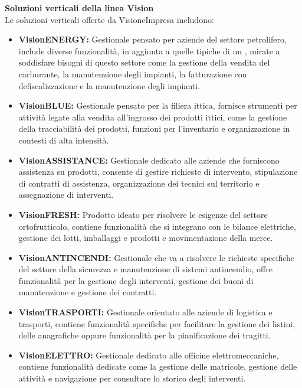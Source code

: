 \textbf{Soluzioni verticali della linea Vision}\\
Le soluzioni verticali offerte da VisioneImpresa includono:
\begin{itemize}
\item \textbf{VisionENERGY:} Gestionale pensato per aziende del settore petrolifero, include diverse funzionalità, in aggiunta a quelle tipiche di un , mirate a soddisfare bisogni di questo settore come la gestione della vendita del carburante, la manutenzione degli impianti, la fatturazione con defiscalizzazione e la manutenzione degli impianti.


\item \textbf{VisionBLUE:} Gestionale pensato per la filiera ittica, fornisce strumenti per attività legate alla vendita all'ingrosso dei prodotti ittici, come la gestione della tracciabilità dei prodotti, funzioni per l'inventario e organizzazione in contesti di alta intensità.


\item \textbf{VisionASSISTANCE:} Gestionale dedicato alle aziende che forniscono assistenza su prodotti, consente di gestire richieste di intervento, stipulazione di contratti di assistenza, organizzazione dei tecnici sul territorio e assegnazione di interventi.

\item \textbf{VisionFRESH:} Prodotto ideato per risolvere le esigenze del settore ortofrutticolo, contiene funzionalità che si integrano con le bilance elettriche, gestione dei lotti, imballaggi e prodotti e movimentazione della merce. 

\item \textbf{VisionANTINCENDI:} Gestionale che va a risolvere le richieste specifiche del settore della sicurezza e manutenzione di sistemi antincendio, offre funzionalità per la gestione degli interventi, gestione dei buoni di manutenzione e gestione dei contratti.


\item \textbf{VisionTRASPORTI:} Gestionale orientato alle aziende di logistica e trasporti, contiene funzionalità specifiche per facilitare la gestione dei listini, delle anagrafiche oppure funzionalità per la pianificazione dei tragitti.

\item \textbf{VisionELETTRO:} Gestionale dedicato alle officine elettromeccaniche, contiene funzionalità dedicate come la gestione delle matricole, gestione delle attività e navigazione per consultare lo storico degli interventi.

\end{itemize}

